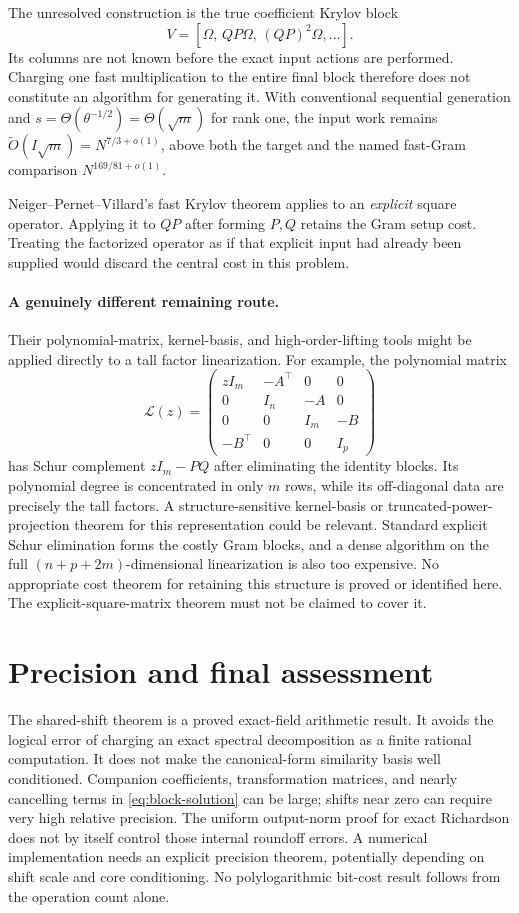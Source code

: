 \documentclass[11pt]{article}
\newcommand{\tO}{\widetilde O}
\begin{document}
The unresolved construction is the true coefficient Krylov block
\[
 V=[\Omega,\,QP\Omega,\,(QP)^2\Omega,\ldots].
\]
Its columns are not known before the exact input actions are performed.
Charging one fast multiplication to the entire final block therefore
does not constitute an algorithm for generating it. With conventional
sequential generation and \(s=\Theta(\theta^{-1/2})=\Theta(\sqrt m)\)
for rank one, the input work remains
\(\tO(I\sqrt m)=N^{7/3+o(1)}\), above both the target and the
named fast-Gram comparison \(N^{169/81+o(1)}\).

Neiger--Pernet--Villard's fast Krylov theorem applies to an
\emph{explicit} square operator. Applying it to \(QP\) after
forming \(P,Q\) retains the Gram setup cost. Treating the factorized
operator as if that explicit input had already been supplied would
discard the central cost in this problem.

\paragraph{A genuinely different remaining route.}
Their polynomial-matrix, kernel-basis, and high-order-lifting tools might
be applied directly to a tall factor linearization. For example, the
polynomial matrix
\[
 \mathcal L(z)=
 \begin{pmatrix}
 zI_m&-A^\top&0&0\\
 0&I_n&-A&0\\
 0&0&I_m&-B\\
 -B^\top&0&0&I_p
 \end{pmatrix}
\]
has Schur complement \(zI_m-PQ\) after eliminating the identity
blocks. Its polynomial degree is concentrated in only \(m\) rows,
while its off-diagonal data are precisely the tall factors. A
structure-sensitive kernel-basis or truncated-power-projection theorem
for this representation could be relevant. Standard explicit Schur
elimination forms the costly Gram blocks, and a dense algorithm on the
full \((n+p+2m)\)-dimensional linearization is also too expensive.
No appropriate cost theorem for retaining this structure is proved or
identified here. The explicit-square-matrix theorem must not be claimed
to cover it.

\section{Precision and final assessment}
The shared-shift theorem is a proved exact-field arithmetic result. It
avoids the logical error of charging an exact spectral decomposition as
a finite rational computation. It does not make the canonical-form
similarity basis well conditioned. Companion coefficients, transformation
matrices, and nearly cancelling terms in \eqref{eq:block-solution}
can be large; shifts near zero can require very high relative precision.
The uniform output-norm proof for exact Richardson does not by itself
control those internal roundoff errors. A numerical implementation needs
an explicit precision theorem, potentially depending on shift scale and
core conditioning. No polylogarithmic bit-cost result follows from the
operation count alone.
\end{document}
